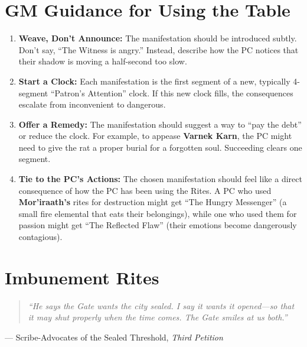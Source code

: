\documentclass[12pt,twoside]{book}
\begin{document}
\section*{GM Guidance for Using the Table}

\begin{enumerate}
    \item \textbf{Weave, Don't Announce:} The manifestation should be introduced subtly. Don't say, ``The Witness is angry.'' Instead, describe how the PC notices that their shadow is moving a half-second too slow.

    \item \textbf{Start a Clock:} Each manifestation is the first segment of a new, typically 4-segment ``Patron's Attention'' clock. If this new clock fills, the consequences escalate from inconvenient to dangerous.

    \item \textbf{Offer a Remedy:} The manifestation should suggest a way to ``pay the debt'' or reduce the clock. For example, to appease \textbf{Varnek Karn}, the PC might need to give the rat a proper burial for a forgotten soul. Succeeding clears one segment.

    \item \textbf{Tie to the PC's Actions:} The chosen manifestation should feel like a direct consequence of how the PC has been using the Rites. A PC who used \textbf{Mor'iraath's} rites for destruction might get ``The Hungry Messenger'' (a small fire elemental that eats their belongings), while one who used them for passion might get ``The Reflected Flaw'' (their emotions become dangerously contagious).
\end{enumerate}

\section*{Imbunement Rites}

\begin{quote}\itshape
``He says the Gate wants the city sealed. I say it wants it opened---so that it may \emph{shut properly} when the time comes. The Gate smiles at us both.''
\end{quote}
\begin{flushright}
--- Scribe-Advocates of the Sealed Threshold, \textit{Third Petition}
\end{flushright}
\end{document}
